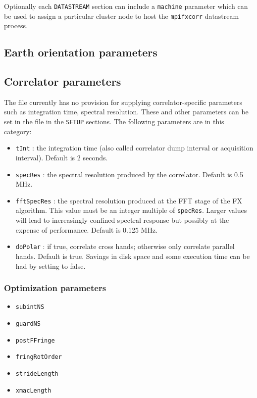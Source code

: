 \documentclass[12pt]{article}
\begin{document}
Optionally each {\tt DATASTREAM} section can include a {\tt machine} parameter which can be used to assign a particular cluster node to host the {\tt mpifxcorr} datastream process.



\subsection{Earth orientation parameters}



\subsection{Correlator parameters}

The \vx file currently has no provision for supplying correlator-specific parameters such as integration time, spectral resolution.
These and other parameters can be set in the \vd file in the {\tt SETUP} sections.
The following parameters are in this category:
\begin{itemize}
\item {\tt tInt} : the integration time (also called correlator dump interval or acquisition interval).  Default is 2 seconds.
\item {\tt specRes} : the spectral resolution produced by the correlator.  Default is 0.5 MHz.
\item {\tt fftSpecRes} : the spectral resolution produced at the FFT stage of the FX algorithm.  This value must be an integer multiple of {\tt specRes}.  Larger values will lead to increasingly confined spectral response but possibly at the expense of performance.  Default is 0.125 MHz.
\item {\tt doPolar} : if true, correlate cross hands; otherwise only correlate parallel hands.  Default is true.  Savings in disk space and some execution time can be had by setting to false.

\end{itemize}

\subsubsection{Optimization parameters}

\begin{itemize}
\item {\tt subintNS}
\item {\tt guardNS}
\item {\tt postFFringe}
\item {\tt fringRotOrder}
\item {\tt strideLength}
\item {\tt xmacLength}

\end{itemize}
\end{document}
